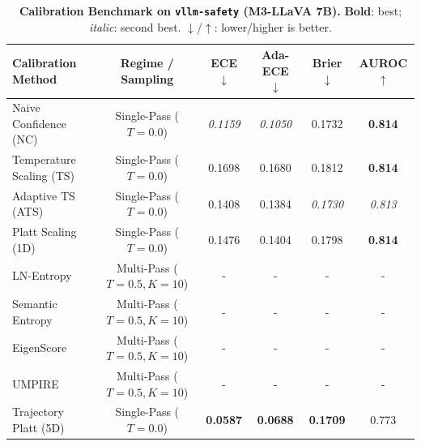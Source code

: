\begin{table}[t]
\setlength{\tabcolsep}{4pt}
\renewcommand{\arraystretch}{1.05}
\centering
\footnotesize
\begin{tabular}{lccccc}
\toprule
\textbf{Calibration Method} & \textbf{Regime / Sampling} & \textbf{ECE} $\downarrow$ & \textbf{Ada-ECE} $\downarrow$ & \textbf{Brier} $\downarrow$ & \textbf{AUROC} $\uparrow$ \\
\midrule
Naive Confidence (NC) & Single-Pass ($T = 0.0$) & \textit{0.1159} & \textit{0.1050} & 0.1732 & \textbf{0.814} \\
Temperature Scaling (TS) & Single-Pass ($T = 0.0$) & 0.1698 & 0.1680 & 0.1812 & \textbf{0.814} \\
Adaptive TS (ATS) & Single-Pass ($T = 0.0$) & 0.1408 & 0.1384 & \textit{0.1730} & \textit{0.813} \\
Platt Scaling (1D) & Single-Pass ($T = 0.0$) & 0.1476 & 0.1404 & 0.1798 & \textbf{0.814} \\
LN-Entropy & Multi-Pass ($T = 0.5, K = 10$) & - & - & - & - \\
Semantic Entropy & Multi-Pass ($T = 0.5, K = 10$) & - & - & - & - \\
EigenScore & Multi-Pass ($T = 0.5, K = 10$) & - & - & - & - \\
UMPIRE & Multi-Pass ($T = 0.5, K = 10$) & - & - & - & - \\
Trajectory Platt (5D) & Single-Pass ($T = 0.0$) & \textbf{0.0587} & \textbf{0.0688} & \textbf{0.1709} & 0.773 \\
\bottomrule
\end{tabular}
\caption{\textbf{Calibration Benchmark on \texttt{vllm-safety} (M3-LLaVA 7B).} \textbf{Bold}: best; \textit{italic}: second best. $\downarrow$/$\uparrow$: lower/higher is better.}
\label{tab:benchmark_m3_vllmsafety}
\end{table}

